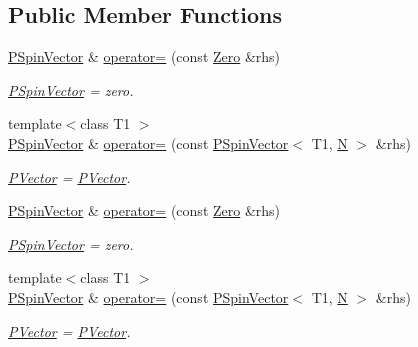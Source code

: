 \subsection*{Public Member Functions}
\begin{DoxyCompactItemize}
\item 
\mbox{\hyperlink{classENSEM_1_1PSpinVector}{P\+Spin\+Vector}} \& \mbox{\hyperlink{classENSEM_1_1PSpinVector_aff99857da5f6f68093f04c9df5355e84}{operator=}} (const \mbox{\hyperlink{structENSEM_1_1Zero}{Zero}} \&rhs)
\begin{DoxyCompactList}\small\item\em \mbox{\hyperlink{classENSEM_1_1PSpinVector}{P\+Spin\+Vector}} = zero. \end{DoxyCompactList}\item 
{\footnotesize template$<$class T1 $>$ }\\\mbox{\hyperlink{classENSEM_1_1PSpinVector}{P\+Spin\+Vector}} \& \mbox{\hyperlink{classENSEM_1_1PSpinVector_a6c7a984a7ab5ad8939e0a9bc57a93660}{operator=}} (const \mbox{\hyperlink{classENSEM_1_1PSpinVector}{P\+Spin\+Vector}}$<$ T1, \mbox{\hyperlink{operator__name__util_8cc_a7722c8ecbb62d99aee7ce68b1752f337}{N}} $>$ \&rhs)
\begin{DoxyCompactList}\small\item\em \mbox{\hyperlink{classENSEM_1_1PVector}{P\+Vector}} = \mbox{\hyperlink{classENSEM_1_1PVector}{P\+Vector}}. \end{DoxyCompactList}\item 
\mbox{\hyperlink{classENSEM_1_1PSpinVector}{P\+Spin\+Vector}} \& \mbox{\hyperlink{classENSEM_1_1PSpinVector_aff99857da5f6f68093f04c9df5355e84}{operator=}} (const \mbox{\hyperlink{structENSEM_1_1Zero}{Zero}} \&rhs)
\begin{DoxyCompactList}\small\item\em \mbox{\hyperlink{classENSEM_1_1PSpinVector}{P\+Spin\+Vector}} = zero. \end{DoxyCompactList}\item 
{\footnotesize template$<$class T1 $>$ }\\\mbox{\hyperlink{classENSEM_1_1PSpinVector}{P\+Spin\+Vector}} \& \mbox{\hyperlink{classENSEM_1_1PSpinVector_a6c7a984a7ab5ad8939e0a9bc57a93660}{operator=}} (const \mbox{\hyperlink{classENSEM_1_1PSpinVector}{P\+Spin\+Vector}}$<$ T1, \mbox{\hyperlink{operator__name__util_8cc_a7722c8ecbb62d99aee7ce68b1752f337}{N}} $>$ \&rhs)
\begin{DoxyCompactList}\small\item\em \mbox{\hyperlink{classENSEM_1_1PVector}{P\+Vector}} = \mbox{\hyperlink{classENSEM_1_1PVector}{P\+Vector}}. \end{DoxyCompactList}\end{DoxyCompactItemize}
